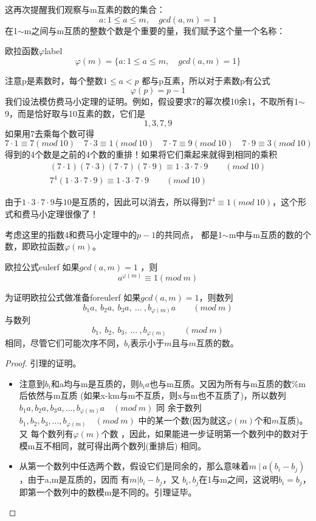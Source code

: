 这再次提醒我们观察与m互素的数的集合：
$$
{a:1\leqslant a\leqslant m,\quad gcd(a,m)=1}
$$
{\heiti 在1$\sim$m之间与m互质的整数个数}是个重要的量，我们赋予这个量一个名称：


\begin{definition}{欧拉函数$\varphi$}{label}
$$
\varphi(m)=\{a:1\leqslant a\leqslant m,\quad gcd(a,m)=1\}
$$
\end{definition}

注意p是素数时，每个整数$1\leqslant a<p$ 都与p互素，所以对于素数p有公式
$$
\varphi(p)=p-1
$$
我们设法模仿费马小定理的证明。例如，假设要求7的幂次模10余1，不取所有1$\sim$9，而是恰好取与10互素的数，它们是
$$
1,3,7,9
$$
如果用7去乘每个数可得
$$
7\cdot 1\equiv 7(mod\ 10)\quad 7\cdot 3\equiv 1(mod\ 10)\quad
7\cdot 7\equiv 9(mod\ 10)\quad 7\cdot9\equiv 3(mod\ 10)
$$
{\heiti 得到的4个数是之前的4个数的重排！}如果将它们乘起来就得到相同的乘积
\begin{align*}
(7\cdot 1)(7\cdot 3)(7\cdot7)(7\cdot9)\equiv 1\cdot3\cdot7\cdot9  \qquad  (mod\ 10)  \\
7^4(1\cdot3\cdot7\cdot9)\equiv 1\cdot3\cdot7\cdot9 \qquad (mod\ 10)
\end{align*}

由于$1\cdot3\cdot7\cdot9$与$10$是互质的，因此可以消去，所以得到$7^4\equiv 1(mod\ 10)$，这个形式和费马小定理很像了！

考虑这里的指数4和费马小定理中的$p-1$的共同点， 都是1$\sim$m中与m互质的数的个数，即欧拉函数$\varphi(m)$。


\begin{theorem}{欧拉公式}{eulerf}
如果$gcd(a,m)=1$ ，则
$$
a^{\varphi(m)}\equiv 1 (mod\ m)
$$
\end{theorem}

\begin{lemma}{为证明欧拉公式做准备}{foreulerf}
如果$gcd(a,m)=1$，则数列
$$
b_1a,\ b_2a,\ b_3a,\ ...\ ,b_{\varphi(m)}a  \qquad  (mod\ m)
$$
与数列
$$
b_1,\ b_2,\ b_3,\ ...\ ,b_{\varphi(m)} \qquad (mod\ m)
$$
相同，尽管它们可能次序不同，$b_i$表示小于$m$且与$m$互质的数。
\end{lemma}

\begin{proof}
引理的证明。
\begin{itemize}
	\item 注意到$b_i$和a均与m是互质的，则$b_ia$也与m互质。{\heiti 又因为所有与m互质的数\%m后依然与m互质} 
	(如果x-km与m不互质，则x与m也不互质了)，所以数列$b_1a,b_2a,b_3a,...,b_{\varphi(m)}a  \quad  (mod\ m)$ 同
	余于数列$b_1,b_2,b_3,...,b_{\varphi(m)} \quad (mod\ m)$ 中的某一个数(因为就这$\varphi(m)$个和$m$互质)。又
	每个数列有$\varphi(m)$个数 ，因此，如果能进一步证明第一个数列中的数对于模m互不相同，就可得出两个数列(重排后)
	相同。  
	\item 从第一个数列中任选两个数，假设它们是同余的，那么意味着$m\ |\ a(b_i-b_j)$，由于a,m是互质的，因而
	有$m|b_i-b_j$，又 $b_i ,b_j$在1与m之间，这说明$b_i=b_j$，即第一个数列中的数模m是不同的。引理证毕。
\end{itemize}
\end{proof}



